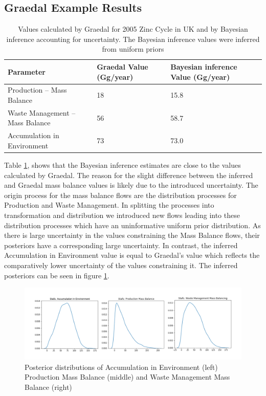 \documentclass[ %
                    author={Tom Jager},
                supervisor={Dr. Daniel Schien},
                    degree={MEng},
                     title={A Bayesian Inference Engine for Calibrating Uncertainty over UMIS Structured MFA Systems},
                  subtitle={},
                      type={research},
                      year={2019} ]{dissertation}
\begin{document}
\subsection{Graedal Example Results}
\begin{table}[h]
    \small
    \center
    \begin{tabular}{|l|l|l|}
        \hline
        \textbf{Parameter}              & \textbf{Graedal Value (Gg/year)} & \textbf{Bayesian inference Value (Gg/year)} \\ \hline
        Production – Mass Balance       & 18                     & 15.8                              \\ \hline
        Waste Management – Mass Balance & 56                     & 58.7                              \\ \hline
        Accumulation in Environment      & 73                     & 73.0                                \\ \hline
    \end{tabular}
    \caption{Values calculated by Graedal for 2005 Zinc Cycle in UK and by Bayesian inference accounting for uncertainty. The Bayesian inference values were inferred from uniform priors}
    \label{table:graedal_results}
\end{table}
Table \ref{table:graedal_results}, shows that the Bayesian inference estimates are close to the values calculated by Graedal. The reason for the slight difference between the inferred and Graedal mass balance values is likely due to the introduced uncertainty. The origin process for the mass balance flows are the distribution processes for Production and Waste Management. In splitting the processes into transformation and distribution we introduced new flows leading into these distribution processes which have an uninformative uniform prior distribution. As there is large uncertainty in the values constraining the Mass Balance flows, their  posteriors have a corresponding large uncertainty. In contrast, the inferred Accumulation in Environment value is equal to Graedal's value which reflects the comparatively lower uncertainty of the values constraining it. The inferred posteriors can be seen in figure \ref{fig:mass_balance_posteriors}.

\begin{figure}[t]
    \centering
    \includegraphics[width=\linewidth]{images/graedal_data_posteriors.png}
    \caption{Posterior distributions of Accumulation in Environment (left) Production Mass Balance (middle) and Waste Management Mass Balance (right)}
    \label{fig:mass_balance_posteriors}
\end{figure}
\end{document}
